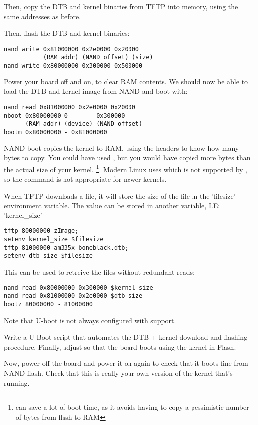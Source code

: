 Then, copy the DTB and kernel binaries from TFTP into memory, using the
same addresses as before.

Then, flash the DTB and kernel binaries:

\begin{verbatim}
nand write 0x81000000 0x2e0000 0x20000
           (RAM addr) (NAND offset) (size)
nand write 0x80000000 0x300000 0x500000
\end{verbatim}

Power your board off and on, to clear RAM contents. We should now be
able to load the DTB and kernel image from NAND and boot with:

\begin{verbatim}
nand read 0x81000000 0x2e0000 0x20000
nboot 0x80000000 0        0x300000
      (RAM addr) (device) (NAND offset)
bootm 0x80000000 - 0x81000000
\end{verbatim}

NAND boot  copies the kernel to RAM, using the  headers
to know how many bytes to copy. You could have used , but you would have copied more bytes than
the actual size of your kernel. \footnote{ can save a lot 
of boot time, as it avoids having to copy a pessimistic number of
bytes from flash to RAM}. Modern Linux uses  which is not
supported by , so the command is not appropriate for newer kernels.

When TFTP downloads a file, it will store the size of the file in the 'filesize'
environment variable. The value can be stored in another variable, I.E: 'kernel\_size'

\begin{verbatim}
tftp 80000000 zImage; 
setenv kernel_size $filesize
tftp 81000000 am335x-boneblack.dtb; 
setenv dtb_size $filesize
\end{verbatim}

This can be used to retreive the files without redundant reads:

\begin{verbatim}
nand read 0x80000000 0x300000 $kernel_size
nand read 0x81000000 0x2e0000 $dtb_size
bootz 80000000 - 81000000
\end{verbatim}

Note that U-boot is not always configured
with  support.

Write a U-Boot script that automates the DTB + kernel download
and flashing procedure. Finally, adjust  so that
the board boots using the kernel in Flash.

Now, power off the board and power it on again to check that it boots
fine from NAND flash. Check that this is really your own version of
the kernel that's running.
